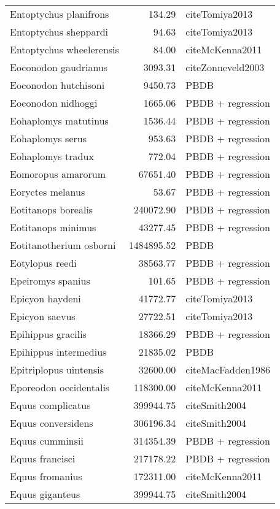 \begin{table}[ht]
\begin{tabular}{lrl}
  Entoptychus planifrons & 134.29 & cite{Tomiya2013} \\ 
  Entoptychus sheppardi & 94.63 & cite{Tomiya2013} \\ 
  Entoptychus wheelerensis & 84.00 & cite{McKenna2011} \\ 
  Eoconodon gaudrianus & 3093.31 & cite{Zonneveld2003} \\ 
  Eoconodon hutchisoni & 9450.73 & PBDB \\ 
  Eoconodon nidhoggi & 1665.06 & PBDB + regression \\ 
  Eohaplomys matutinus & 1536.44 & PBDB + regression \\ 
  Eohaplomys serus & 953.63 & PBDB + regression \\ 
  Eohaplomys tradux & 772.04 & PBDB + regression \\ 
  Eomoropus amarorum & 67651.40 & PBDB + regression \\ 
  Eoryctes melanus & 53.67 & PBDB + regression \\ 
  Eotitanops borealis & 240072.90 & PBDB + regression \\ 
  Eotitanops minimus & 43277.45 & PBDB + regression \\ 
  Eotitanotherium osborni & 1484895.52 & PBDB \\ 
  Eotylopus reedi & 38563.77 & PBDB + regression \\ 
  Epeiromys spanius & 101.65 & PBDB + regression \\ 
  Epicyon haydeni & 41772.77 & cite{Tomiya2013} \\ 
  Epicyon saevus & 27722.51 & cite{Tomiya2013} \\ 
  Epihippus gracilis & 18366.29 & PBDB + regression \\ 
  Epihippus intermedius & 21835.02 & PBDB \\ 
  Epitriplopus uintensis & 32600.00 & cite{MacFadden1986} \\ 
  Eporeodon occidentalis & 118300.00 & cite{McKenna2011} \\ 
  Equus complicatus & 399944.75 & cite{Smith2004} \\ 
  Equus conversidens & 306196.34 & cite{Smith2004} \\ 
  Equus cumminsii & 314354.39 & PBDB + regression \\ 
  Equus francisci & 217178.22 & PBDB + regression \\ 
  Equus fromanius & 172311.00 & cite{McKenna2011} \\ 
  Equus giganteus & 399944.75 & cite{Smith2004} \\ 

\end{tabular}
\end{table}
